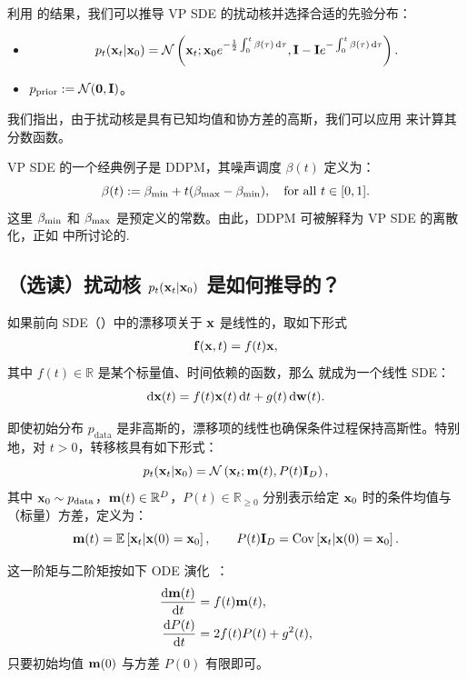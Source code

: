利用  的结果，我们可以推导 VP SDE 的扰动核并选择合适的先验分布：
\begin{itemize}
    \item {}
    \[
    p_t({\mathbf{x}}_t|{\mathbf{x}}_0) = \mathcal{N}\left({\mathbf{x}}_t ; {\mathbf{x}}_0 e^{-\frac{1}{2}\int_{0}^{t} \beta(\tau)\mathop{}\!\mathrm{d} \tau}, {\mathbf{I}} - {\mathbf{I}} e^{-\int_{0}^{t} \beta(\tau)\mathop{}\!\mathrm{d} \tau}\right).
    \]
    \item {}$p_{\mathrm{prior}} := \mathcal{N}(\bm{0}, {\mathbf{I}})$。
\end{itemize}
我们指出，由于扰动核是具有已知均值和协方差的高斯，我们可以应用  来计算其分数函数。

VP SDE 的一个经典例子是 DDPM，其噪声调度 $\beta(t)$ 定义为：
\[
\beta(t) := \beta_{\textup{min}} + t(\beta_{\textup{max}} - \beta_{\textup{min}}), \quad \text{for all } t \in [0,1].
\]
这里 $\beta_{\textup{min}}$ 和 $\beta_{\textup{max}}$ 是预定义的常数。由此，DDPM 可被解释为 VP SDE 的离散化，正如  中所讨论的.




\subsection{（选读）扰动核 $ p_t({\mathbf{x}}_t|{\mathbf{x}}_0) $ 是如何推导的？}\label{subsec:scoresde-perturbation-kernel}
如果前向 SDE（）中的漂移项关于 ${\mathbf{x}}$ 是线性的，取如下形式
\begin{align*}
    {\mathbf{f}}({\mathbf{x}}, t) = f(t) {\mathbf{x}},
\end{align*}
其中 $f(t) \in \mathbb{R}$ 是某个标量值、时间依赖的函数，那么  就成为一个线性 SDE：
\[
\mathop{}\!\mathrm{d}{\mathbf{x}}(t) = f(t){\mathbf{x}}(t) \mathop{}\!\mathrm{d} t + g(t) \mathop{}\!\mathrm{d}{\mathbf{w}}(t).
\]


即使初始分布 $p_{\mathrm{data}}$ 是非高斯的，漂移项的线性也确保条件过程保持高斯性。特别地，对 $t>0$，转移核具有如下形式：
\[
p_t( {\mathbf{x}}_t | {\mathbf{x}}_0 ) = \mathcal{N} \left( {\mathbf{x}}_t;  {\mathbf{m}}(t),  P(t) \mathbf{I}_D \right),
\]
其中 ${\mathbf{x}}_0 \sim p_{\mathrm{data}}$，${\mathbf{m}}(t) \in \mathbb{R}^D$，$P(t)\in\mathbb{R}_{\ge 0}$ 分别表示给定 ${\mathbf{x}}_0$ 时的条件均值与（标量）方差，定义为：
\[
{\mathbf{m}}(t) = \mathbb{E} \left[{\mathbf{x}}_t | {\mathbf{x}}(0) = {\mathbf{x}}_0\right], \qquad
P(t) \mathbf{I}_D = \operatorname{Cov} \left[{\mathbf{x}}_t | {\mathbf{x}}(0) = {\mathbf{x}}_0\right].
\]

这一阶矩与二阶矩按如下 ODE 演化~\citep{sarkka2019applied}：
\begin{align}\label{eq:mean-var-evolution}
\begin{aligned}
    \frac{\mathop{}\!\mathrm{d} {\mathbf{m}}(t)}{\mathop{}\!\mathrm{d} t} &= f(t) {\mathbf{m}}(t), \\
    \frac{\mathop{}\!\mathrm{d} P(t)}{\mathop{}\!\mathrm{d} t} &= 2f(t) P(t) + g^2(t),
\end{aligned}
\end{align}
只要初始均值 ${\mathbf{m}}(0)$ 与方差 $P(0)$ 有限即可。

